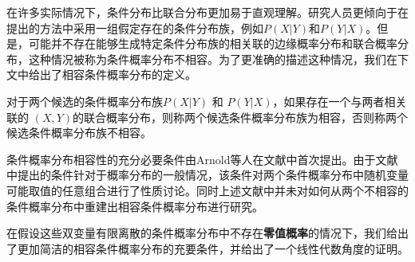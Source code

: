 在许多实际情况下，条件分布比联合分布更加易于直观理解。研究人员更倾向于在提出的方法中采用一组假定存在的条件分布族，例如$P(X|Y)$和$P(Y|X)$\cite{arnold1989compatible}。但是，可能并不存在能够生成特定条件分布族的相关联的边缘概率分布和联合概率分布，这种情况被称为条件概率分布不相容。为了更准确的描述这种情况，我们在下文中给出了相容条件概率分布的定义。

\begin{definition}
    对于两个候选的条件概率分布族$ P(X|Y) $ 和 $ P(Y|X) $，如果存在一个与两者相关联的 $ (X,Y) $的联合概率分布，则称两个候选条件概率分布族为相容，否则称两个候选条件概率分布族不相容。
\end{definition}

条件概率分布相容性的充分必要条件由Arnold等人在文献\parencite{arnold1989compatible}中首次提出。由于文献\parencite{arnold1989compatible}中提出的条件针对于概率分布的一般情况，该条件对两个条件概率分布中随机变量可能取值的任意组合进行了性质讨论。同时上述文献中并未对如何从两个不相容的条件概率分布中重建出相容条件概率分布进行研究。

在假设这些双变量有限离散的条件概率分布中不存在\textbf{零值概率}的情况下，我们给出了更加简洁的相容条件概率分布的充要条件，并给出了一个线性代数角度的证明。

